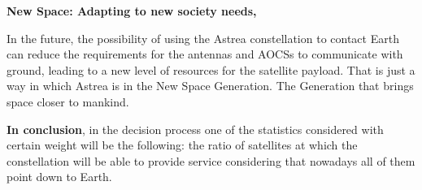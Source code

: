 \textbf{New Space: Adapting to new society needs,}

In the future, the possibility of using the Astrea constellation to contact Earth can reduce the requirements for the antennas and AOCSs to communicate with ground, leading to a new level of resources for the satellite payload. That is just a way in which Astrea is in the New Space Generation. The Generation that brings space closer to mankind.

\textbf{In conclusion}, in the decision process one of the statistics considered with certain weight will be the following: the ratio of satellites at which the constellation will be able to provide service considering that nowadays all of them point down to Earth. 